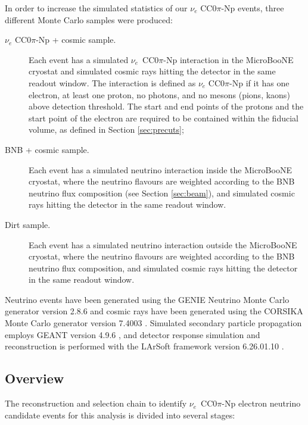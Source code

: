 In order to increase the simulated statistics of our $\nu_e$ CC0$\pi$-Np events, three different Monte Carlo samples were produced:
\begin{description}
\item[$\nu_{e}$ CC0$\pi$-Np + cosmic sample.] Each event has a simulated $\nu_{e}$~CC0$\pi$-Np interaction in the MicroBooNE cryostat and simulated cosmic rays hitting the detector in the same readout window. {The interaction is defined as $\nu_{e}$ CC0$\pi$-Np if it has one electron, at least one proton, no photons, and no mesons (pions, kaons) above detection threshold. The start and end points of the protons and the start point of the electron are required to be contained within the fiducial volume, as defined in Section \ref{sec:precuts}};
\item[BNB + cosmic sample.] Each event has a simulated neutrino interaction inside the MicroBooNE cryostat, where the neutrino flavours are weighted according to the BNB neutrino flux composition (see Section \ref{sec:beam}), and simulated cosmic rays hitting the detector in the same readout window.
\item[Dirt sample.] Each event has a simulated neutrino interaction outside the MicroBooNE cryostat, where the neutrino flavours are weighted according to the BNB neutrino flux composition, and simulated cosmic rays hitting the detector in the same readout window.
\end{description}

Neutrino events have been generated using the GENIE Neutrino Monte Carlo generator version 2.8.6 \cite{Andreopoulos:2009rq} and cosmic rays have been generated using the CORSIKA Monte Carlo generator version 7.4003 \cite{Heck:1998vt}. Simulated secondary particle propagation employs GEANT version 4.9.6 \cite{Brun:1994aa}, and detector response simulation and reconstruction is performed with the LArSoft framework version 6.26.01.10 \cite{Church:2013hea}.

\subsection{Overview}
The reconstruction and selection chain to identify $\nu_{e}$~CC0$\pi$-Np electron neutrino candidate events for this analysis is divided into several stages:

